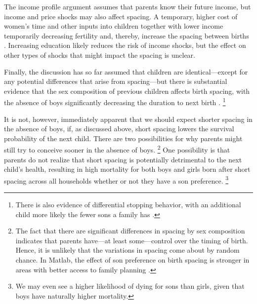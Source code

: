 The income profile argument assumes that parents know their future income, but income and price shocks may also affect spacing. A temporary, higher cost of women's time
and other inputs into children together with lower income temporarily decreasing fertility 
and, thereby, increase the spacing between births \citep{Moffitt1984,Hotz1988,Portner2001,Alam2018}.
Increasing education likely reduces the risk of income shocks, but the effect on other types of shocks that might impact the spacing is unclear.


Finally, the discussion has so far assumed that children are identical---except for any 
potential differences that arise from spacing---but there is substantial 
evidence that the sex composition of previous children affects birth spacing, with the
absence of boys significantly decreasing the duration to next birth
\citep{Haughton1995,Haughton1996,Rahman1993,Bhalotra2008,Kumar2016,Soest2018}.%
\footnote{
There is also evidence of differential stopping behavior, with an additional child more 
likely the fewer sons a family has 
\citep{repetto72,Das1987,Arnold1997,arnold98,clark00,Basu2010,Barcellos2014}.
}

It is not, however, immediately apparent that we should expect shorter spacing in the absence 
of boys, if, as discussed above, short spacing lowers the survival probability of the next child.
There are two possibilities for why parents might still try to conceive sooner in the 
absence of boys.%
\footnote{
The fact that there are significant differences in spacing by sex composition indicates that
parents have---at least some---control over the timing of birth.
Hence, it is unlikely that the variations in spacing come about by random chance.
In Matlab, the effect of son preference on birth spacing is stronger in areas with better 
access to family planning \citep{Rahman1993}.
}
One possibility is that parents do not realize that short spacing is potentially
detrimental to the next child's health, resulting in high mortality for both boys and girls 
born after short spacing across all households whether or not they have a son preference.%
\footnote{
We may even see a higher likelihood of dying for sons than girls, given that boys 
have naturally higher mortality.
}

